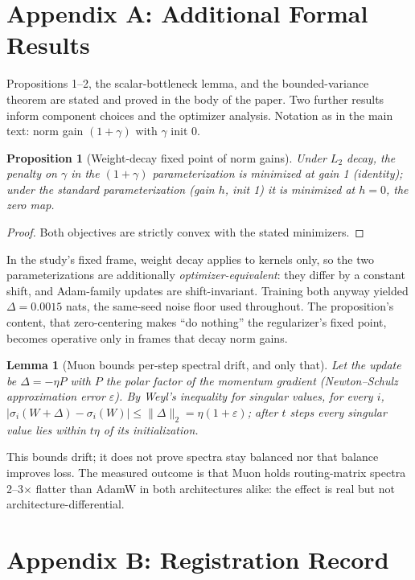 \documentclass[letterpaper]{article} %
\newtheorem{proposition}{Proposition}
\newtheorem{lemma}{Lemma}
\begin{document}


\section{Appendix A: Additional Formal Results}

Propositions 1--2, the scalar-bottleneck lemma, and the bounded-variance
theorem are stated and proved in the body of the paper. Two further results
inform component choices and the optimizer analysis. Notation as in the
main text: norm gain $(1+\gamma)$ with $\gamma$ init 0.

\begin{proposition}[Weight-decay fixed point of norm gains]
Under $L_2$ decay, the penalty on $\gamma$ in the $(1+\gamma)$
parameterization is minimized at gain 1 (identity); under the standard
parameterization (gain $h$, init 1) it is minimized at $h=0$, the zero
map.
\end{proposition}
\begin{proof}
Both objectives are strictly convex with the stated minimizers.
\end{proof}
In the study's fixed frame, weight decay applies to kernels only, so the
two parameterizations are additionally \emph{optimizer-equivalent}: they
differ by a constant shift, and Adam-family updates are shift-invariant.
Training both anyway yielded $\Delta = 0.0015$ nats, the same-seed noise
floor used throughout. The proposition's content, that zero-centering
makes ``do nothing'' the regularizer's fixed point, becomes operative
only in frames that decay norm gains.

\begin{lemma}[Muon bounds per-step spectral drift, and only that]
Let the update be $\Delta = -\eta P$ with $P$ the polar factor of the
momentum gradient (Newton--Schulz approximation error $\varepsilon$). By
Weyl's inequality for singular values, for every $i$,
$|\sigma_i(W+\Delta)-\sigma_i(W)| \le \|\Delta\|_2 = \eta(1+\varepsilon)$;
after $t$ steps every singular value lies within $t\eta$ of its
initialization.
\end{lemma}
This bounds drift; it does not prove spectra stay balanced nor that
balance improves loss. The measured outcome is that Muon holds
routing-matrix spectra 2--3$\times$ flatter than AdamW in both
architectures alike: the effect is real but not architecture-differential.

\section{Appendix B: Registration Record}
\end{document}
